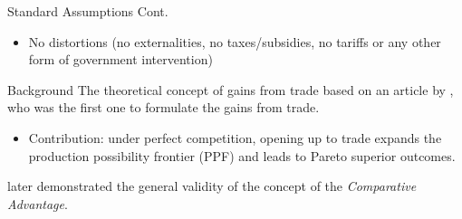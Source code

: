 \documentclass{beamer}
\begin{document}
\begin{frame}{Standard Assumptions Cont.}
\begin{itemize}
     \item No distortions (no externalities, no taxes/subsidies, no tariffs or any other form of government intervention)
 \end{itemize}
\end{frame}


\begin{frame}{Background}
    The theoretical concept of gains from trade based on an article by \textcite{samuelson_comparative_advantage}, who was the first one to formulate the gains from trade. 
    \begin{itemize}
        \item Contribution: under perfect competition, opening up to trade expands the production possibility frontier (PPF) and leads to Pareto superior outcomes. %
    \end{itemize}
    \textcite{deardorff_1980} later demonstrated the general validity of the concept of the \textit{Comparative Advantage}.
\end{frame}
\end{document}
